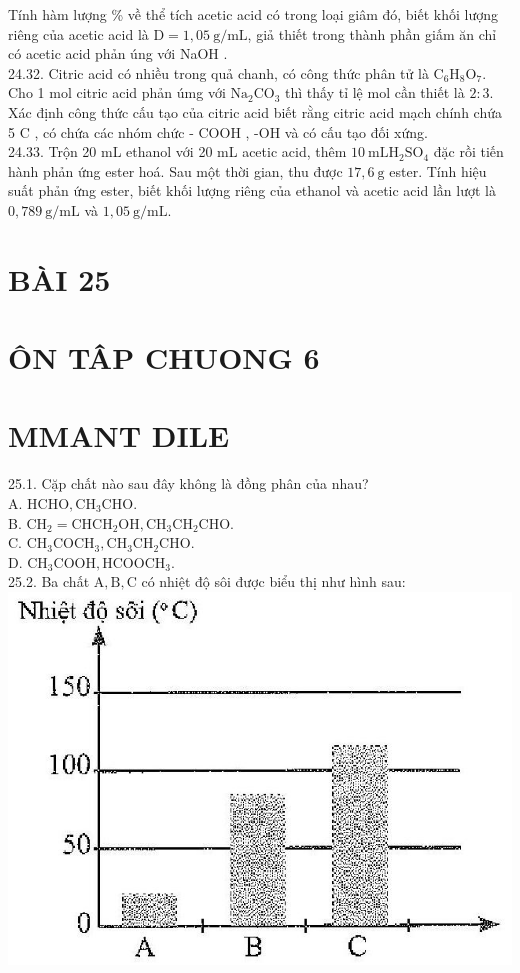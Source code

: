 \documentclass[10pt]{article}
\begin{document}
Tính hàm lượng \% về thể tích acetic acid có trong loại giâm đó, biết khối lượng riêng của acetic acid là $\mathrm{D}=1,05 \mathrm{~g} / \mathrm{mL}$, giả thiết trong thành phần giấm ăn chỉ có acetic acid phản úng với NaOH .\\
24.32. Citric acid có nhiều trong quả chanh, có công thức phân tử là $\mathrm{C}_{6} \mathrm{H}_{8} \mathrm{O}_{7}$. Cho 1 mol citric acid phản úmg với $\mathrm{Na}_{2} \mathrm{CO}_{3}$ thì thấy tỉ lệ mol cần thiết là $2: 3$. Xác định công thức cấu tạo của citric acid biết rằng citric acid mạch chính chứa 5 C , có chứa các nhóm chức - COOH , -OH và có cấu tạo đối xứng.\\
24.33. Trộn 20 mL ethanol với 20 mL acetic acid, thêm $10 \mathrm{~mL} \mathrm{H}_{2} \mathrm{SO}_{4}$ đặc rồi tiến hành phản ứng ester hoá. Sau một thời gian, thu được $17,6 \mathrm{~g}$ ester. Tính hiệu suất phản ứng ester, biết khối lượng riêng của ethanol và acetic acid lần lượt là $0,789 \mathrm{~g} / \mathrm{mL}$ và $1,05 \mathrm{~g} / \mathrm{mL}$.

\section*{BÀI 25}
\section*{ÔN TÂP CHUONG 6}
\section*{MMANT DILE}
25.1. Cặp chất nào sau đây không là đồng phân của nhau?\\
A. $\mathrm{HCHO}, \mathrm{CH}_{3} \mathrm{CHO}$.\\
B. $\mathrm{CH}_{2}=\mathrm{CHCH}_{2} \mathrm{OH}, \mathrm{CH}_{3} \mathrm{CH}_{2} \mathrm{CHO}$.\\
C. $\mathrm{CH}_{3} \mathrm{COCH}_{3}, \mathrm{CH}_{3} \mathrm{CH}_{2} \mathrm{CHO}$.\\
D. $\mathrm{CH}_{3} \mathrm{COOH}, \mathrm{HCOOCH}_{3}$.\\
25.2. Ba chất $\mathrm{A}, \mathrm{B}, \mathrm{C}$ có nhiệt độ sôi được biểu thị như hình sau:\\
\includegraphics[max width=\textwidth, center]{2025_10_23_fa9073eecee116ad8cf2g-88}
\end{document}

